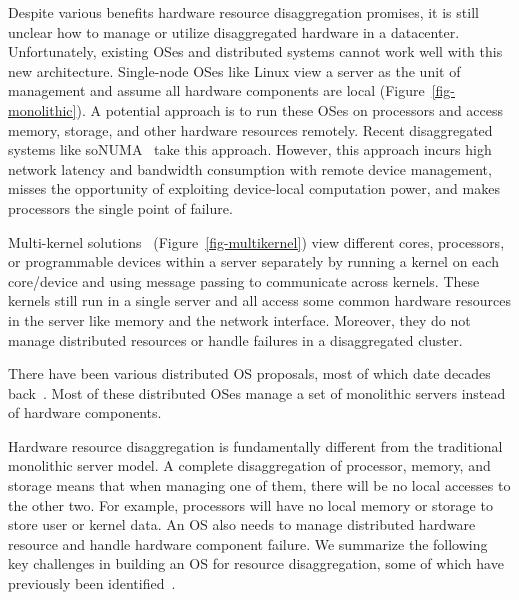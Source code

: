 Despite various benefits hardware resource disaggregation promises, 
it is still unclear how to manage or utilize disaggregated hardware in a datacenter.
Unfortunately, existing OSes and distributed systems cannot work well with this new architecture.
Single-node OSes like Linux view a server as the unit of management and assume all hardware components are local (Figure~\ref{fig-monolithic}).
A potential approach is to run these OSes on processors
and access memory, storage, and other hardware resources remotely.
Recent disaggregated systems like soNUMA~\cite{Scaleout-numa} take this approach.
However, this approach incurs high network latency and bandwidth consumption with remote device management,
misses the opportunity of exploiting device-local computation power,
and makes processors the single point of failure.



Multi-kernel solutions~\cite{Baumann-SOSP09,Barrelfish-DC,Helios-SOSP,fos-SOCC,Hive-SOSP} (Figure~\ref{fig-multikernel}) 
view different cores, processors, or programmable devices within a server separately 
by running a kernel on each core/device and using message passing to communicate across kernels.
These kernels still run in a single server and all access some common hardware resources in the server like memory and the network interface.
Moreover, they do not manage distributed resources or handle failures in a disaggregated cluster. 

There have been various distributed OS proposals,
most of which date decades back~\cite{Amoeba-Experience,Sprite,MOSIX}. %
Most of these distributed OSes manage a set of monolithic servers
instead of hardware components.

Hardware resource disaggregation is fundamentally different from the traditional monolithic server model.
A complete disaggregation of processor, memory, and storage 
means that when managing one of them, there will be no local accesses to the other two.
For example, processors will have no local memory or storage to store user or kernel data.
An OS also needs to manage distributed hardware resource and handle hardware component failure.
We summarize the following key challenges in building an OS for resource disaggregation,
some of which have previously been identified~\cite{HP-MemoryOS}.

